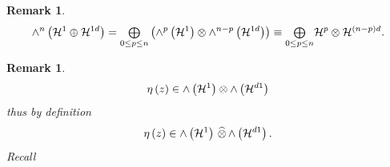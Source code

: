 \documentclass[aps,preprint]{revtex4}%
\newtheorem{remark}[theorem]{Remark}
\begin{document}
\begin{remark}%
\begin{equation}
{\huge \wedge}^{n}\left(  \mathcal{H}^{1}\oplus\mathcal{H}^{1d}\right)  =%
{\textstyle\bigoplus\limits_{0\leq p\leq n}}
\left(  {\huge \wedge}^{p}\left(  \mathcal{H}^{1}\right)  \otimes
{\huge \wedge}^{n-p}\left(  \mathcal{H}^{1d}\right)  \right)  \equiv%
{\textstyle\bigoplus\limits_{0\leq p\leq n}}
\mathcal{H}^{p}\otimes\mathcal{H}^{\left(  n-p\right)  d}.
\end{equation}

\end{remark}

\begin{remark}%
\begin{equation}
\eta\left(  z\right)  \in{\huge \wedge}\left(  \mathcal{H}^{1}\right)
\otimes{\huge \wedge}\left(  \mathcal{H}^{d1}\right)
\end{equation}
thus by definition
\begin{equation}
\eta\left(  z\right)  \in{\huge \wedge}\left(  \mathcal{H}^{1}\right)
\,\widehat{\otimes}\,{\huge \wedge}\left(  \mathcal{H}^{d1}\right)  .
\end{equation}
Recall
\end{remark}
\end{document}
